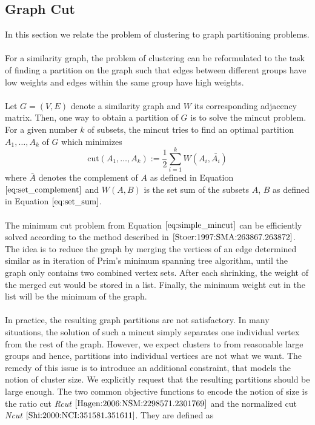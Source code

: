 \subsection{Graph Cut}
\label{sec:graph_cut}
In this section we relate the problem of clustering to graph partitioning problems. \\ \\
For a similarity graph, the problem of clustering can be reformulated to the task of finding a partition on the graph such that edges between different groups have low weights and edges within the same group have high weights. \\ \\
Let $G = (V, E)$ denote a similarity graph and $W$ its corresponding adjacency matrix. Then, one way to obtain a partition of $G$ is to solve the mincut problem. For a given number $k$ of subsets, the mincut tries to find an optimal partition $A_1, \dots, A_k$ of $G$ which minimizes
\begin{equation}
\text{cut} \left( A_1, \dots, A_k \right) := \frac{1}{2} \sum_{i=1}^k W \left( A_i, \bar{A_i} \right)
\label{eq:simple_mincut} 
\end{equation}
where $\bar{A}$ denotes the complement of $A$ as defined in Equation $\ref{eq:set_complement}$ and $W(A,B)$ is the set sum of the subsets $A$, $B$ as defined in Equation $\ref{eq:set_sum}$. \\ \\
The minimum cut problem from Equation $\ref{eq:simple_mincut}$ can be efficiently solved according to the method described in $\cite{Stoer:1997:SMA:263867.263872}$. The idea is to reduce the graph by merging the vertices of an edge determined similar as in iteration of Prim's minimum spanning tree algorithm, until the graph only contains two combined vertex sets. After each shrinking, the weight of the merged cut would be stored in a list. Finally, the minimum weight cut in the list will be the minimum of the graph. \\ \\
In practice, the resulting graph partitions are not satisfactory. In many situations, the solution of such a mincut simply separates one individual vertex from the rest of the graph. However, we expect clusters to from reasonable large groups and hence, partitions into individual vertices are not what we want. The remedy of this issue is to introduce an additional constraint, that models the notion of cluster size. We explicitly request that the resulting partitions should be large enough. 
The two common objective functions to encode the notion of size is the ratio cut \textit{Rcut} $\cite{Hagen:2006:NSM:2298571.2301769}$ and the normalized cut \textit{Ncut} $\cite{Shi:2000:NCI:351581.351611}$. They are defined as
